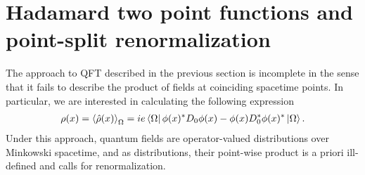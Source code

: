 %
%
%

\section{Hadamard two point functions and point-split renormalization}
\label{sec:Hadamard}
The approach to QFT described in the previous section is incomplete in the sense that it fails to describe the product of fields at coinciding spacetime points. In particular, we are interested in calculating the following expression
\begin{align}
	\rho(x) = \left<\hat{\rho}(x) \right>_\Omega= ie\bra{\Omega} \phi(x)^* D_0\phi(x) - \phi(x) D_0^* \phi(x)^* \ket{\Omega}.
	\label{eq:rho-expectation-value}
\end{align}
Under this approach, quantum fields are operator-valued distributions over Minkowski spacetime, and as distributions, their point-wise product is a priori ill-defined and calls for renormalization.

